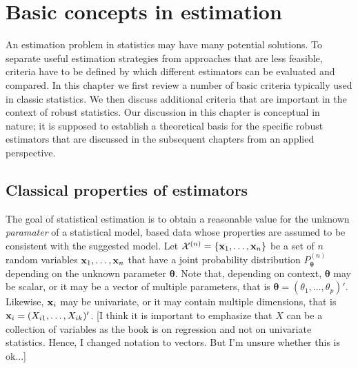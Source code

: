 
\chapter{Basic concepts in estimation}
\label{chap:theory}

An estimation problem in statistics may have many potential solutions. To
separate useful estimation strategies from approaches that are less feasible,
criteria have to be defined by which different estimators can be evaluated and
compared. In this chapter we first review a number of basic criteria typically
used in classic statistics. We then discuss additional criteria that are
important in the context of robust statistics. Our discussion in this chapter
is conceptual in nature; it is supposed to establish a theoretical basis for
the specific robust estimators that are discussed in the subsequent chapters
from an applied perspective.

\section{Classical properties of estimators}

The goal of statistical estimation is to obtain a reasonable value for the
unknown \emph{paramater} of a statistical model, based data whose properties
are assumed to be consistent with the suggested model. Let $\mathcal{X}^{(n)} =
\{\mathbf x_1, \dots, \mathbf x_n\}$                                            
be a set of $n$ random variables $\mathbf x_1, \ldots, \mathbf x_n$ that have a joint
probability distribution $P_{\boldsymbol\theta}^{(n)}$ depending on the unknown
parameter $\boldsymbol\theta$. Note that, depending on context,
$\boldsymbol\theta$ may be scalar, or it may be a vector of multiple parameters,
that is $\boldsymbol\theta = (\theta_1, \dots, \theta_p)'$. Likewise, $\mathbf x_i$
may be univariate, or it may contain multiple dimensions, that is $\mathbf x_i =
(X_{i1}, \dots, X_{ik})'$. \alert{[I think it is important to
emphasize that $X$ can be a collection of variables as the book is on
regression and not on univariate statistics. Hence, I changed notation to vectors.
But I'm unsure whether this is ok...]}


